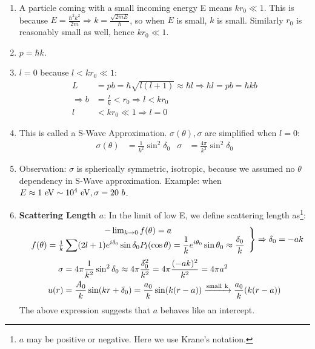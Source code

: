 \documentclass{school-22.101-notes}
\begin{document}
\begin{enumerate}
\item A particle coming with a small incoming energy E means $k r_0 \ll 1$. This is because $E = \frac{\hbar^2 k^2}{2m} \Rightarrow k = \frac{\sqrt{2mE}}{\hbar}$, so when $E$ is small, $k$ is small. Similarly $r_0$ is reasonably small as well, hence $k r_0 \ll 1$. 

\item $ p = \hbar k$. 

\item $l=0$ because $l<kr_0 \ll 1$:
\begin{align}
L &= pb = \hbar \sqrt{l (l+1)} \approx \hbar l \Rightarrow \hbar l = pb = \hbar k b \\
\Rightarrow b &= \frac{l}{k} < r_0 \Rightarrow l < kr_0 \\
l &< k r_0 \ll 1 \Rightarrow l = 0
\end{align}

\item This is called a S-Wave Approximation. $\sigma (\theta), \sigma$ are simplified when $l=0$:
\begin{align}
\sigma (\theta) &= \frac{1}{k^2} \sin^2 \delta_0 & \sigma &= \boxed{ \frac{4 \pi}{k^2} \sin^2 \delta_0 } \label{sigma}
\end{align}

\item Observation: $\sigma$ is spherically symmetric, isotropic, because we assumed no $\theta$ dependency in S-Wave approximation. Example: when $E \approx 1 \mbox{ } \mathrm{eV} \sim 10^4 \mbox{ } \mathrm{eV}, \sigma = 20 \mbox{ } b$. 

\item \textbf{Scattering Length $a$}: In the limit of low E, we define scattering length as\footnote{$a$ may be positive or negative. Here we use Krane's notation.}:
\begin{align}
\left. \begin{array}{c}
- \lim_{k\to 0} f(\theta) = a  \\
f(\theta) = \frac{1}{k} \displaystyle\sum (2l+1) e^{i \delta_0} \sin \delta_0  P_l (\cos \theta) = \frac{1}{k} e^{i\theta_0} \sin \theta_0  \approx \frac{\delta_0}{k} 
\end{array} 
\right\} \Rightarrow \delta_0 = -ak
\end{align}
\begin{align}
\sigma &= 4 \pi \frac{1}{k^2} \sin^2 \delta_0 \approx 4 \pi \frac{\delta_0^2}{k^2} =  4 \pi \frac{(-ak)^2}{k^2} = 4 \pi a^2 \\
u(r) &= \frac{A_0}{k} \sin(kr + \delta_0) = \frac{a_0}{k} \sin (k(r-a)) \xrightarrow{\mathrm{small \mbox{ } k}} \frac{a_0}{k} (k(r-a))
\end{align} 
The above expression suggests that $a$ behaves like an intercept.


\end{enumerate}
\end{document}
